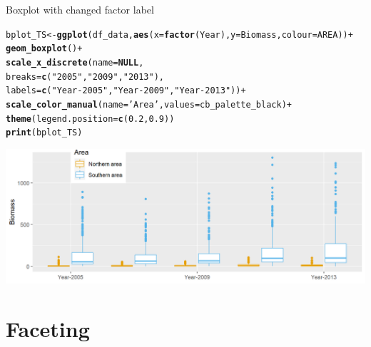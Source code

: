 \documentclass{beamer}\usepackage[]{graphicx}\usepackage[]{color}
\makeatletter
\newcommand{\hlnum}[1]{\textcolor[rgb]{0.686,0.059,0.569}{#1}}%
\newcommand{\hlstr}[1]{\textcolor[rgb]{0.192,0.494,0.8}{#1}}%
\newcommand{\hlopt}[1]{\textcolor[rgb]{0,0,0}{#1}}%
\newcommand{\hlstd}[1]{\textcolor[rgb]{0.345,0.345,0.345}{#1}}%
\newcommand{\hlkwa}[1]{\textcolor[rgb]{0.161,0.373,0.58}{\textbf{#1}}}%
\newcommand{\hlkwb}[1]{\textcolor[rgb]{0.69,0.353,0.396}{#1}}%
\newcommand{\hlkwc}[1]{\textcolor[rgb]{0.333,0.667,0.333}{#1}}%
\newcommand{\hlkwd}[1]{\textcolor[rgb]{0.737,0.353,0.396}{\textbf{#1}}}%
\newenvironment{kframe}{%
 \def\at@end@of@kframe{}%
 \ifinner\ifhmode%
  \def\at@end@of@kframe{\end{minipage}}%
  \begin{minipage}{\columnwidth}%
 \fi\fi%
 \def\FrameCommand##1{\hskip\@totalleftmargin \hskip-\fboxsep
 \colorbox{shadecolor}{##1}\hskip-\fboxsep
     \hskip-\linewidth \hskip-\@totalleftmargin \hskip\columnwidth}%
 \MakeFramed {\advance\hsize-\width
   \@totalleftmargin\z@ \linewidth\hsize
   \@setminipage}}%
 {\par\unskip\endMakeFramed%
 \at@end@of@kframe}
\newenvironment{knitrout}{}{} %
\makeatother
\begin{document}
\begin{frame}[fragile]{Boxplot with changed factor label}
\begin{knitrout}\footnotesize
{}\color{fgcolor}\begin{kframe}
\begin{alltt}
\hlstd{bplot_TS} \hlkwb{<-} \hlkwd{ggplot}\hlstd{(df_data,} \hlkwd{aes}\hlstd{(}\hlkwc{x}\hlstd{=}\hlkwd{factor}\hlstd{(Year),} \hlkwc{y}\hlstd{=Biomass,} \hlkwc{colour}\hlstd{=AREA))} \hlopt{+}
  \hlkwd{geom_boxplot}\hlstd{()} \hlopt{+}
  \hlkwd{scale_x_discrete}\hlstd{(}\hlkwc{name}\hlstd{=}\hlkwa{NULL}\hlstd{,}
                   \hlkwc{breaks}\hlstd{=}\hlkwd{c}\hlstd{(}\hlstr{"2005"}\hlstd{,} \hlstr{"2009"}\hlstd{,} \hlstr{"2013"}\hlstd{),}
                   \hlkwc{labels}\hlstd{=}\hlkwd{c}\hlstd{(}\hlstr{"Year-2005"}\hlstd{,} \hlstr{"Year-2009"}\hlstd{,} \hlstr{"Year-2013"}\hlstd{))} \hlopt{+}
  \hlkwd{scale_color_manual}\hlstd{(}\hlkwc{name}\hlstd{=}\hlstr{'Area'}\hlstd{,} \hlkwc{values} \hlstd{= cb_palette_black)} \hlopt{+}
  \hlkwd{theme}\hlstd{(}\hlkwc{legend.position}\hlstd{=}\hlkwd{c}\hlstd{(}\hlnum{0.2}\hlstd{,}\hlnum{0.9}\hlstd{))}
\hlkwd{print}\hlstd{(bplot_TS)}
\end{alltt}
\end{kframe}

{\centering \includegraphics[width=.9\linewidth]{figure/boxplot_TSf_AREA_final-1} 

}



\end{knitrout}

\end{frame}

\section{Faceting}
\end{document}
